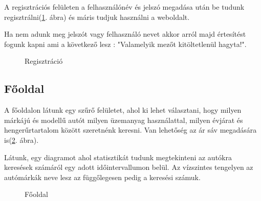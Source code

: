 A regisztrációs felületen a felhasználónév és jelszó megadása után be tudunk regisztrálni(\ref{fig:Regisztráció}. ábra) és máris tudjuk használni a weboldalt.

Ha nem adunk meg jelszót vagy felhasználó nevet akkor arról majd értesítést fogunk kapni ami a következő lesz : "Valamelyik mezőt kitöltetlenül hagyta!".

\begin{figure}[h]
\centering
{}
\caption{Regisztráció}
\label{fig:Regisztráció}
\end{figure}

\newpage
\subsection{Főoldal}

A főoldalon látunk egy szűrő felületet, ahol ki lehet választani, hogy milyen márkájú és modellű autót milyen üzemanyag használattal, milyen évjárat és hengerűrtartalom között szeretnénk keresni. Van lehetőség az ár sáv megadására is(\ref{fig:Fooldal}. ábra).

Látunk, egy diagramot ahol statisztikát tudunk megtekinteni az autókra keresések számáról egy adott időintervallumon belül. Az vízszintes tengelyen az autómárkák neve lesz az függőlegesen pedig a keresési számuk.

\begin{figure}[h]
\centering
{}
\caption{Főoldal}
\label{fig:Fooldal}
\end{figure}

